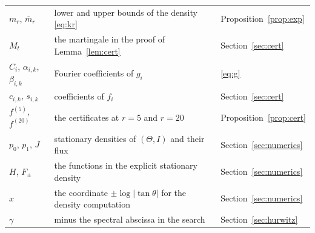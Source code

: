 \documentclass[11pt]{amsart}
\begin{document}
\begin{center}
\begin{tabular}{@{}lp{}l@{}}
$m_r$, $\overline m_r$ & lower and upper bounds of the density \eqref{eq:kr} & Proposition~\ref{prop:exp}\\
$M_t$ & the martingale in the proof of Lemma~\ref{lem:cert} & Section~\ref{sec:cert}\\
$C_i$, $\alpha_{i,k}$, $\beta_{i,k}$ & Fourier coefficients of $g_i$ & \eqref{eq:g}\\
$c_{i,k}$, $s_{i,k}$ & coefficients of $f_i$ & Section~\ref{sec:cert}\\
$f^{(5)}$, $f^{(20)}$ & the certificates at $r=5$ and $r=20$ & Proposition~\ref{prop:cert}\\
$p_0$, $p_1$, $J$ & stationary densities of $(\Theta,I)$ and their flux & Section~\ref{sec:numerics}\\
$H$, $F_\pm$ & the functions in the explicit stationary density & Section~\ref{sec:numerics}\\
$x$ & the coordinate $\pm\log|\tan\theta|$ for the density computation & Section~\ref{sec:numerics}\\
$\gamma$ & minus the spectral abscissa in the search & Section~\ref{sec:hurwitz}\\
\bottomrule
\end{tabular}
\end{center}
\end{document}
